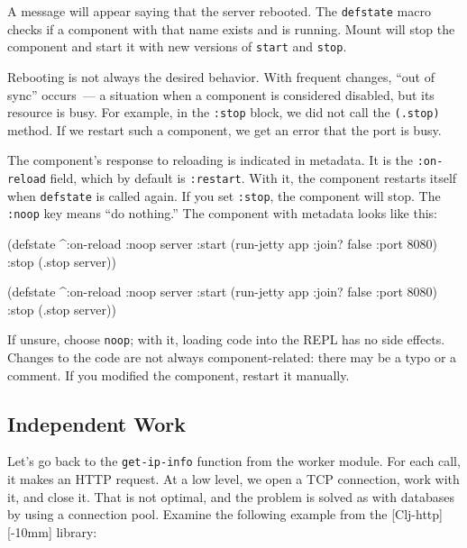 A message will appear saying that the server rebooted. The \verb|defstate| macro checks if a component with that name exists and is running. Mount will stop the component and start it with new versions of \verb|start| and \verb|stop|.

Rebooting is not always the desired behavior. With frequent changes, ``out of sync'' occurs~--- a situation when a component is considered disabled, but its resource is busy. For example, in the \verb|:stop| block, we did not call the \verb|(.stop)| method. If we restart such a component, we get an error that the port is busy.

The component's response to reloading is indicated in metadata. It is the \verb|:on-reload| field, which by default is \verb|:restart|. With it, the component restarts itself when \verb|defstate| is called again. If you set \verb|:stop|, the component will stop. The \verb|:noop| key means ``do nothing.'' The component with metadata looks like this:

\ifnarrow

\begin{english}
  \begin{clojure}
(defstate
  ^{:on-reload :noop}
  server
  :start (run-jetty app
           {:join? false :port 8080})
  :stop (.stop server))
  \end{clojure}
\end{english}

\else

\begin{english}
  \begin{clojure}
(defstate
  ^{:on-reload :noop}
  server
  :start (run-jetty app {:join? false :port 8080})
  :stop (.stop server))
  \end{clojure}
\end{english}

\fi

If unsure, choose \verb|noop|; with it, loading code into the REPL has no side effects. Changes to the code are not always component-related: there may be a typo or a comment. If you modified the component, restart it manually.

\subsection{Independent Work}


Let's go back to the \verb|get-ip-info| function from the worker module. For each call, it makes an HTTP request. At a low level, we open a TCP connection, work with it, and close it. That is not optimal, and the problem is solved as with databases by using a connection pool. Examine the following example from the [Clj-http][-10mm] library:

